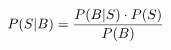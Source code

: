 \documentclass[preview]{standalone}
\begin{document}
\begin{align*}
\special{dvisvgm:raw <g id='unique000'>}P(S|B) = \frac{P(B|S) \cdot P(S)}{P(B)}\special{dvisvgm:raw </g>}
\end{align*}
\end{document}
